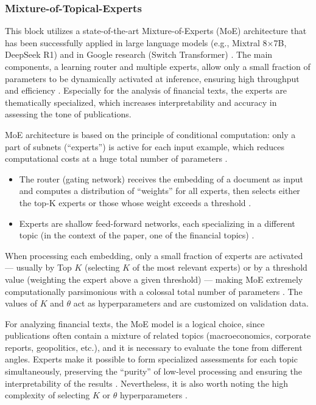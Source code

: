 \subsubsection{Mixture-of-Topical-Experts}

This block utilizes a state-of-the-art Mixture-of-Experts (MoE) architecture that has been successfully
applied in large language models (e.g., Mixtral 8×7B, DeepSeek R1) and in Google research (Switch Transformer)
\parencite{fedus2022switch}. The main components, a learning router and multiple experts, allow only a small fraction
of parameters to be dynamically activated at inference, ensuring high throughput and efficiency
\parencite{shazeer2017outrageously}. Especially for the analysis of financial texts, the experts are thematically
specialized, which increases interpretability and accuracy in assessing the tone of publications.

MoE architecture is based on the principle of conditional computation: only a part of subnets (“experts”) is active
for each input example, which reduces computational costs at a huge total number of parameters
\parencite{shazeer2017outrageously}.

\begin{itemize}
    \item The router (gating network) receives the embedding of a document as input and computes a distribution
    of “weights” for all experts, then selects either the top-K experts or those whose weight exceeds a threshold
    \parencite{fedus2022switch}.
    \item Experts are shallow feed-forward networks, each specializing in a different topic (in the context
    of the paper, one of the financial topics) \parencite{shazeer2017outrageously}.
\end{itemize}

When processing each embedding, only a small fraction of experts are activated --- usually by Top $K$ (selecting $K$
of the most relevant experts) or by a threshold value (weighting the expert above a given threshold) --- making MoE
extremely computationally parsimonious with a colossal total number of parameters \parencite{fedus2022switch}.
The values of $K$ and $\theta$ act as hyperparameters and are customized on validation data.

For analyzing financial texts, the MoE model is a logical choice, since publications often contain a mixture
of related topics (macroeconomics, corporate reports, geopolitics, etc.), and it is necessary to evaluate the tone
from different angles. Experts make it possible to form specialized assessments for each topic simultaneously,
preserving the “purity” of low-level processing and ensuring the interpretability of the results \parencite{jacobs1991adaptive}.
Nevertheless, it is also worth noting the high complexity of selecting $K$ or $\theta$ hyperparameters
\parencite{jacobs1991adaptive}.


